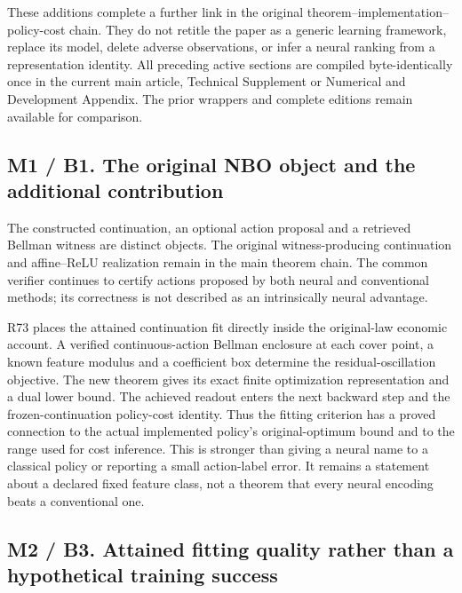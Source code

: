 \documentclass[ecta,nameyear,draft]{econsocart}
\begin{document}
These additions complete a further link in the original
theorem--implementation--policy-cost chain. They do not retitle the
paper as a generic learning framework, replace its model, delete adverse
observations, or infer a neural ranking from a representation identity.
All preceding active sections are compiled byte-identically once in the
current main article, Technical Supplement or Numerical and Development
Appendix. The prior wrappers and complete editions remain available for
comparison.

\hypertarget{m1-b1.-the-original-nbo-object-and-the-additional-contribution}{%
\subsection{M1 / B1. The original NBO object and the additional
contribution}\label{m1-b1.-the-original-nbo-object-and-the-additional-contribution}}

The constructed continuation, an optional action proposal and a
retrieved Bellman witness are distinct objects. The original
witness-producing continuation and affine--ReLU realization remain in
the main theorem chain. The common verifier continues to certify actions
proposed by both neural and conventional methods; its correctness is not
described as an intrinsically neural advantage.

R73 places the attained continuation fit directly inside the
original-law economic account. A verified continuous-action Bellman
enclosure at each cover point, a known feature modulus and a coefficient
box determine the residual-oscillation objective. The new theorem gives
its exact finite optimization representation and a dual lower bound. The
achieved readout enters the next backward step and the
frozen-continuation policy-cost identity. Thus the fitting criterion has
a proved connection to the actual implemented policy's original-optimum
bound and to the range used for cost inference. This is stronger than
giving a neural name to a classical policy or reporting a small
action-label error. It remains a statement about a declared fixed
feature class, not a theorem that every neural encoding beats a
conventional one.

\hypertarget{m2-b3.-attained-fitting-quality-rather-than-a-hypothetical-training-success}{%
\subsection{M2 / B3. Attained fitting quality rather than a hypothetical
training
success}\label{m2-b3.-attained-fitting-quality-rather-than-a-hypothetical-training-success}}
\end{document}
